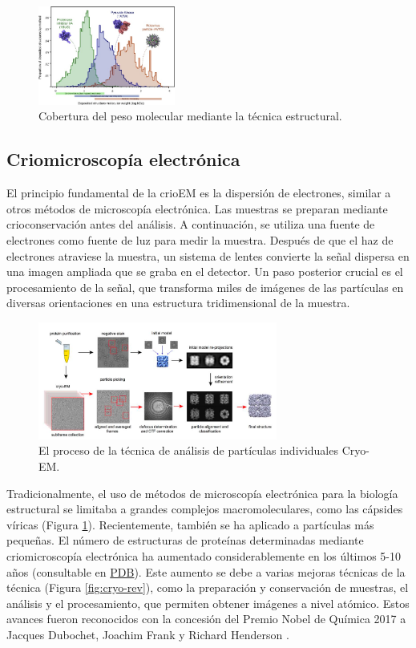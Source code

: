 \begin{figure}[h]
\centering
\includegraphics[width = 0.4\textwidth]{figs/paste-FA73AF1E.png}
\caption{Cobertura del peso molecular mediante la técnica estructural. }
\label{fig:molweight}
\end{figure}

\subsection{Criomicroscopía electrónica}
El principio fundamental de la crioEM es la dispersión de electrones, similar a otros métodos de microscopía electrónica. Las muestras se preparan mediante crioconservación antes del análisis. A continuación, se utiliza una fuente de electrones como fuente de luz para medir la muestra. Después de que el haz de electrones atraviese la muestra, un sistema de lentes convierte la señal dispersa en una imagen ampliada que se graba en el detector. Un paso posterior crucial es el procesamiento de la señal, que transforma miles de imágenes de las partículas en diversas orientaciones en una estructura tridimensional de la muestra.

\begin{figure}[h]
\centering
\includegraphics[width = 0.7\textwidth]{figs/paste-5E29F580.png}
\caption{El proceso de la técnica de análisis de partículas individuales Cryo-EM.}
\label{fig:cryoem}
\end{figure}

Tradicionalmente, el uso de métodos de microscopía electrónica para la biología estructural se limitaba a grandes complejos macromoleculares, como las cápsides víricas (Figura \ref{fig:molweight}). Recientemente, también se ha aplicado a partículas más pequeñas. El número de estructuras de proteínas determinadas mediante criomicroscopía electrónica ha aumentado considerablemente en los últimos 5-10 años (consultable en \href{https://www.rcsb.org/stats/all-released-structures}{PDB}). Este aumento se debe a varias mejoras técnicas de la técnica (Figura \ref{fig:cryo-rev}), como la preparación y conservación de muestras, el análisis y el procesamiento, que permiten obtener imágenes a nivel atómico. Estos avances fueron reconocidos con la concesión del Premio Nobel de Química 2017 a Jacques Dubochet, Joachim Frank y Richard Henderson .

